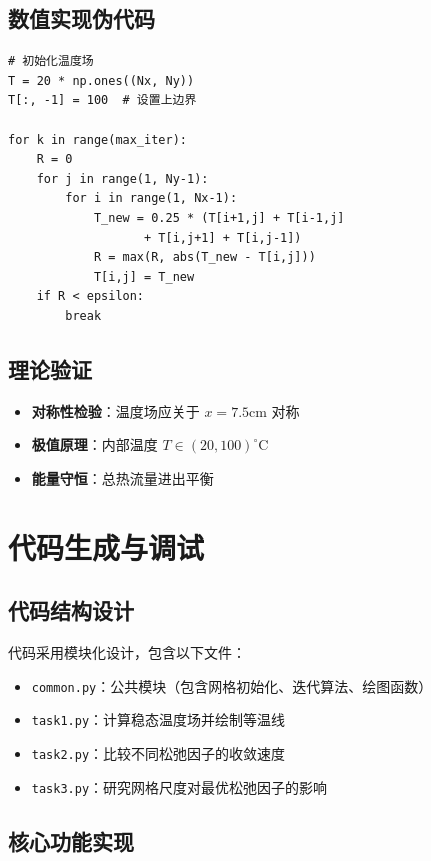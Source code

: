 \documentclass[UTF8]{ctexart}
\begin{document}
\subsection{数值实现伪代码}
\begin{verbatim}
# 初始化温度场
T = 20 * np.ones((Nx, Ny))
T[:, -1] = 100  # 设置上边界

for k in range(max_iter):
    R = 0
    for j in range(1, Ny-1):
        for i in range(1, Nx-1):
            T_new = 0.25 * (T[i+1,j] + T[i-1,j] 
                   + T[i,j+1] + T[i,j-1])
            R = max(R, abs(T_new - T[i,j]))
            T[i,j] = T_new
    if R < epsilon:
        break
\end{verbatim}

\subsection{理论验证}
\begin{itemize}
    \item \textbf{对称性检验}：温度场应关于 $ x=7.5\text{cm} $ 对称
    \item \textbf{极值原理}：内部温度 $ T \in (20,100)^\circ \text{C} $ \\
    \item \textbf{能量守恒}：总热流量进出平衡
\end{itemize}

\newpage
\section{代码生成与调试}

\subsection{代码结构设计}
代码采用模块化设计，包含以下文件：

\begin{itemize}[leftmargin=2cm]
    \item \texttt{common.py}：公共模块（包含网格初始化、迭代算法、绘图函数）
    \item \texttt{task1.py}：计算稳态温度场并绘制等温线
    \item \texttt{task2.py}：比较不同松弛因子的收敛速度
    \item \texttt{task3.py}：研究网格尺度对最优松弛因子的影响
\end{itemize}

\subsection{核心功能实现}
\end{document}
